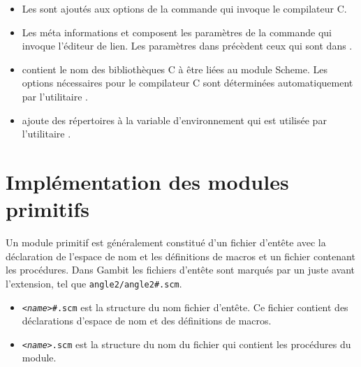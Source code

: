\begin{itemize}
  \item Les  sont ajoutés aux options de la commande qui
    invoque le compilateur C.

  \item Les méta informations  et 
    composent les paramètres de la commande qui invoque l'éditeur de lien.
    Les paramètres dans  précèdent ceux
    qui sont dans .

  \item {} contient le nom des bibliothèques C à être
    liées au module Scheme. Les options nécessaires pour le compilateur
    C sont déterminées automatiquement par l'utilitaire .

  \item {} ajoute des répertoires à la variable d'environnement
     qui est utilisée par l'utilitaire .

\end{itemize}

\section{Implémentation des modules primitifs}

Un module primitif est généralement constitué d'un fichier d'entête avec la
déclaration de l'espace de nom et les définitions de macros et un fichier
contenant les procédures. Dans Gambit les fichiers d'entête sont marqués par un
\lstcode{#} juste avant l'extension, tel que \texttt{angle2/angle2\#.scm}.

\begin{itemize}
  \item \texttt{\textit{<name>}\#.scm} est la structure du nom fichier d'entête.
    Ce fichier contient des déclarations d'espace de nom et des
    définitions de macros.

  \item \texttt{\textit{<name>}.scm} est la structure du nom du fichier qui contient
    les procédures du module.

\end{itemize}

